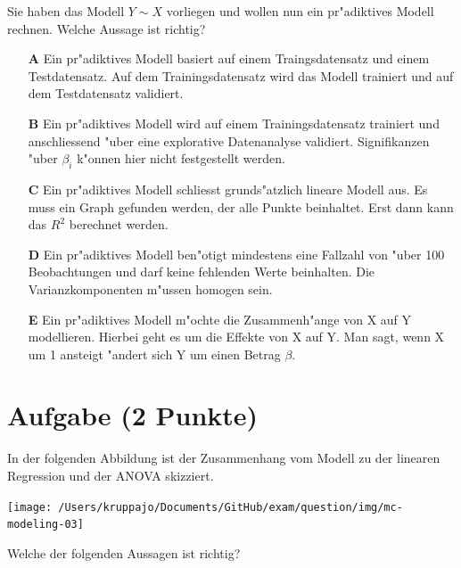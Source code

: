 \documentclass[a4paper, 10pt]{scrartcl}\usepackage[]{graphicx}\usepackage[]{xcolor}
\begin{document}
Sie haben das Modell $Y \sim X$ vorliegen und wollen nun ein
pr{"a}diktives Modell rechnen. Welche Aussage ist richtig?



\begin{enumerate}
\item [\textbf{A} \msquare] Ein pr{"a}diktives Modell basiert auf einem Traingsdatensatz und einem Testdatensatz. Auf dem Trainingsdatensatz wird das Modell trainiert und auf dem Testdatensatz validiert.
\item [\textbf{B} \msquare] Ein pr{"a}diktives Modell wird auf einem Trainingsdatensatz trainiert und anschliessend {"u}ber eine explorative Datenanalyse validiert. Signifikanzen {"u}ber $\beta_i$ k{"o}nnen hier nicht festgestellt werden.
\item [\textbf{C} \msquare] Ein pr{"a}diktives Modell schliesst grunds{"a}tzlich lineare Modell aus. Es muss ein Graph gefunden werden, der alle Punkte beinhaltet. Erst dann kann das $R^2$ berechnet werden.
\item [\textbf{D} \msquare] Ein pr{"a}diktives Modell ben{"o}tigt mindestens eine Fallzahl von {"u}ber 100 Beobachtungen und darf keine fehlenden Werte beinhalten. Die Varianzkomponenten m{"u}ssen homogen sein.
\item [\textbf{E} \msquare] Ein pr{"a}diktives Modell m{"o}chte die Zusammenh{"a}nge von X auf Y modellieren. Hierbei geht es um die Effekte von X auf Y. Man sagt, wenn X um 1 ansteigt {"a}ndert sich Y um einen Betrag $\beta$.
\end{enumerate}

\section{Aufgabe \hfill (2 Punkte)}



In der folgenden Abbildung ist der Zusammenhang vom Modell zu der linearen
Regression und der ANOVA skizziert.

\begin{center}
  \texttt{[image: /Users/kruppajo/Documents/GitHub/exam/question/img/mc-modeling-03]}
\end{center}

Welche der folgenden Aussagen ist richtig?
\end{document}
